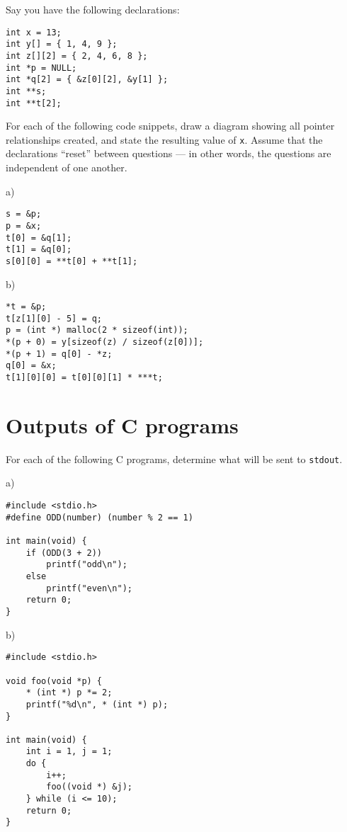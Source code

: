 \documentclass[a4paper,12pt]{article}
\begin{document}
Say you have the following declarations:

\begin{lstlisting}
int x = 13;
int y[] = { 1, 4, 9 };
int z[][2] = { 2, 4, 6, 8 };
int *p = NULL;
int *q[2] = { &z[0][2], &y[1] };
int **s;
int **t[2];
\end{lstlisting}

For each of the following code snippets, draw a diagram showing all
pointer relationships created, and state the resulting value of
\texttt{x}. Assume that the declarations ``reset'' between questions
--- in other words, the questions are independent of one another.

a)


\begin{lstlisting}
s = &p;
p = &x;
t[0] = &q[1];
t[1] = &q[0];
s[0][0] = **t[0] + **t[1];
\end{lstlisting}


b)

\begin{lstlisting}
*t = &p;
t[z[1][0] - 5] = q;
p = (int *) malloc(2 * sizeof(int));
*(p + 0) = y[sizeof(z) / sizeof(z[0])];
*(p + 1) = q[0] - *z;
q[0] = &x;
t[1][0][0] = t[0][0][1] * ***t;
\end{lstlisting}

\newpage

\section{Outputs of C programs}

For each of the following C programs, determine what will be sent to
\texttt{stdout}.

a) %

\begin{lstlisting}
#include <stdio.h>
#define ODD(number) (number % 2 == 1)

int main(void) {
	if (ODD(3 + 2))
		printf("odd\n");
	else
		printf("even\n");
	return 0;
}
\end{lstlisting}

b) %

\begin{lstlisting}
#include <stdio.h>

void foo(void *p) {
	* (int *) p *= 2;
	printf("%d\n", * (int *) p);
}

int main(void) {
	int i = 1, j = 1;
	do {
		i++;
		foo((void *) &j);
	} while (i <= 10);
	return 0;
}
\end{lstlisting}
\end{document}
